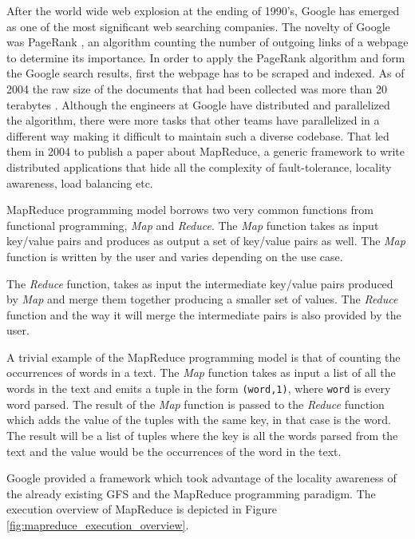 After the world wide web explosion at the ending of 1990's, Google has
emerged as one of the most significant web searching companies.
The novelty of Google was PageRank \cite{ilprints361}, an
algorithm counting the number of outgoing links of a webpage to determine its
importance. In order to apply the PageRank algorithm and form the
Google search results, first the webpage has to be scraped and
indexed. As of 2004 the raw size of the documents that had been
collected was more than 20 terabytes
\cite{Dean:2004:MSD:1251254.1251264}. Although the engineers at Google
have distributed and parallelized the algorithm, there were more tasks
that other teams have parallelized in a different way making it
difficult to maintain such a diverse codebase. That led them in 2004
to publish a paper about MapReduce, a generic framework to write distributed
applications that hide all the complexity of fault-tolerance, locality
awareness, load balancing etc.

MapReduce programming model borrows two very common functions from
functional programming, \emph{Map} and \emph{Reduce}. The \emph{Map}
function takes as input key/value pairs and produces as output a set
of key/value pairs as well. The \emph{Map} function is written by the
user and varies depending on the use case.

The \emph{Reduce} function, takes as input the
intermediate key/value pairs produced by \emph{Map} and merge them
together producing a smaller set of values. The \emph{Reduce} function
and the way it will merge the intermediate pairs is also provided by
the user.

A trivial example of the MapReduce programming model is that of
counting the occurrences of words in a text. The \emph{Map} function
takes as input a list of all the words in the text and emits a tuple
in the form \texttt{(word,1)}, where \texttt{word} is every word
parsed. The result of the \emph{Map} function is passed to the
\emph{Reduce} function which adds the value of the tuples with the
same key, in that case is the word. The result will be a list of
tuples where the key is all the words parsed from the text and the
value would be the occurrences of the word in the text.

Google provided a framework which took advantage of the locality
awareness of the already existing GFS and the MapReduce programming
paradigm. The execution overview of MapReduce is depicted in Figure
\ref{fig:mapreduce_execution_overview}.

